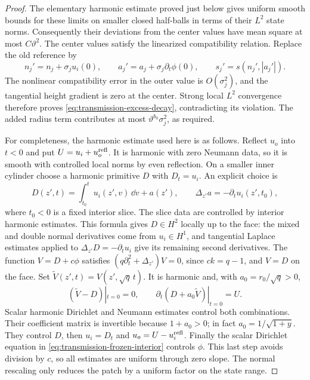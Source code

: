 \begin{proof}
The elementary harmonic estimate proved just below gives uniform
smooth bounds for these limits on smaller closed half-balls in terms
of their $L^2$ state norms.  Consequently their deviations from the
center values have mean square at most $C\vartheta^2$.  The center
values satisfy the linearized compatibility relation.  Replace the
old reference by
\begin{equation}
 n_j'=n_j+\sigma_j u_i(0),\qquad
 a_j'=a_j+\sigma_j\partial_t\phi(0),\qquad
 s_j'=s(n_j',|a_j'|).
 \label{eq:transmission-reference-update}
\end{equation}
The nonlinear compatibility error in the outer value is
$O(\sigma_j^2)$, and the tangential height gradient is zero at the
center.  Strong local $L^2$ convergence therefore proves
\eqref{eq:transmission-excess-decay}, contradicting its violation.
The added radius term contributes at most
$\vartheta^{b_0}\sigma_j^2$, as required.

For completeness, the harmonic estimate used here is as follows.
Reflect $u_o$ into $t<0$ and put $U=u_i+u_o^{\rm refl}$.  It is
harmonic with zero Neumann data, so it is smooth with controlled local
norms by even reflection.  On a smaller inner cylinder choose a
harmonic primitive $D$ with $D_t=u_i$.  An explicit choice is
\begin{equation}
 D(z',t)=\int_{t_0}^{t}u_i(z',v)\,\dd v+a(z'),
 \qquad \Delta_{z'}a=-\partial_tu_i(z',t_0),
 \label{eq:transmission-harmonic-primitive}
\end{equation}
where $t_0<0$ is a fixed interior slice.  The slice data are controlled
by interior harmonic estimates.  This formula gives $D\in H^2$
locally up to the face: the mixed and double normal derivatives come
from $u_i\in H^1$, and tangential Laplace estimates applied to
$\Delta_{z'}D=-\partial_tu_i$ give its remaining second derivatives.
The function $V=D+c\phi$ satisfies
$(q\partial_t^2+\Delta_{z'})V=0$, since $ck=q-1$, and $V=D$
on the face.  Set $\widetilde V(z',t)=V(z',\sqrt q\,t)$.
It is harmonic and, with $a_0=r_0/\sqrt q>0$,
\begin{equation}
 (\widetilde V-D)|_{t=0}=0,
 \qquad \partial_t(D+a_0\widetilde V)|_{t=0}=U.
 \label{eq:transmission-positive-harmonic-combinations}
\end{equation}
Scalar harmonic Dirichlet and Neumann estimates control both
combinations.  Their coefficient matrix is invertible because
$1+a_0>0$; in fact $a_0=1/\sqrt{1+y}$.  They control $D$, then
$u_i=D_t$ and $u_o=U-u_i^{\rm refl}$.  Finally the scalar Dirichlet
equation in \eqref{eq:transmission-frozen-interior} controls $\phi$.
This last step avoids division by $c$, so all estimates are uniform
through zero slope.  The normal rescaling only reduces the patch by
a uniform factor on the state range.


\end{proof}
